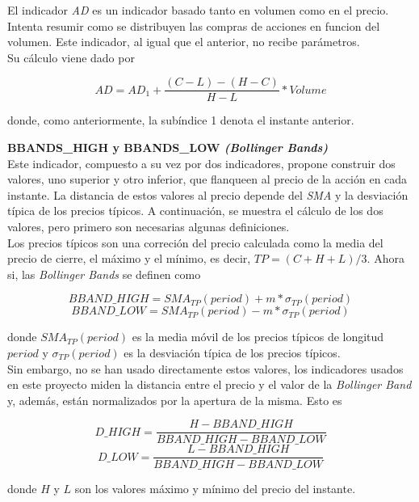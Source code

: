 \begin{appendices}
El indicador \textit{AD} es un indicador basado tanto en volumen como en el precio. Intenta resumir como se distribuyen las compras de acciones en funcion del volumen. Este indicador, al igual que el anterior, no recibe par\'ametros.\\

Su c\'alculo viene dado por

\[AD = AD_{1} + \frac{(C - L) - (H - C)}{H - L}*Volume \]

donde, como anteriormente, la sub\'indice 1 denota el instante anterior.

\vspace{0.5cm}
\noindent\textbf{BBANDS\_HIGH y BBANDS\_LOW \textit{(Bollinger Bands)}}\\

Este indicador, compuesto a su vez por dos indicadores, propone construir dos valores, uno superior y otro inferior, que flanqueen al precio de la acci\'on en cada instante. La distancia de estos valores al precio depende del \textit{SMA} y la desviaci\'on t\'ipica de los precios t\'ipicos. A continuaci\'on, se muestra el c\'alculo de los dos valores, pero primero son necesarias algunas definiciones.\\

Los precios t\'ipicos son una correci\'on del precio calculada como la media del precio de cierre, el m\'aximo y el m\'inimo, es decir, $TP = (C + H + L) / 3$. Ahora si, las \textit{Bollinger Bands} se definen como

\[BBAND\_HIGH = SMA_{TP}(period) + m*\sigma_{TP}(period)\] 
\[BBAND\_LOW = SMA_{TP}(period) - m*\sigma_{TP}(period)\] 

donde $SMA_{TP}(period)$ es la media m\'ovil de los precios t\'ipicos de longitud $period$ y $\sigma_{TP}(period)$ es la desviaci\'on t\'ipica de los precios t\'ipicos.\\

Sin embargo, no se han usado directamente estos valores, los indicadores usados en este proyecto miden la distancia entre el precio y el valor de la \textit{Bollinger Band} y, adem\'as, est\'an normalizados por la apertura de la misma. Esto es

\[D\_HIGH = \frac{H - BBAND\_HIGH}{ BBAND\_HIGH - BBAND\_LOW}\] 
\[D\_LOW =  \frac{L - BBAND\_HIGH}{ BBAND\_HIGH - BBAND\_LOW}\]

donde $H$ y $L$ son los valores m\'aximo y m\'inimo del precio del instante.

\end{appendices}

